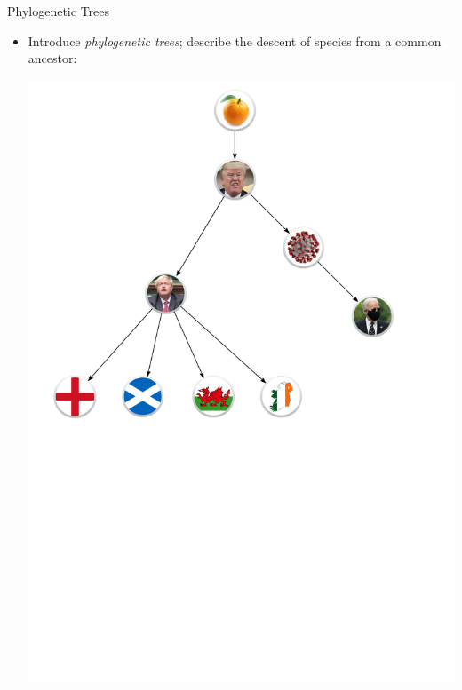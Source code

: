 \begin{frame}{Phylogenetic Trees}

    \begin{itemize}
        \item Introduce \emph{phylogenetic trees}; describe the descent of species from a common ancestor:        

        \begin{center}
        \includegraphics[height=0.75\textheight]{resources/phylogenetic-tree.pdf}
        \end{center}

    \end{itemize}

\end{frame}


